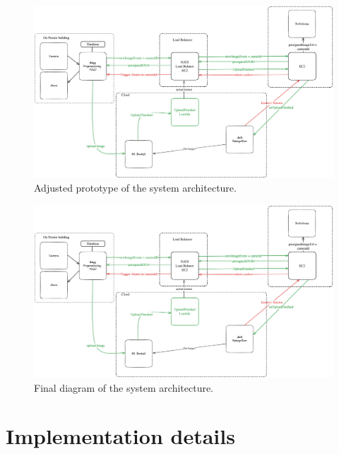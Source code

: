 \documentclass[conference]{IEEEtran}
\begin{document}
\begin{figure}[h!]
	\centering
	\includegraphics[width=1\linewidth]{images/architecturev2.excalidraw.png}
	\caption{Adjusted prototype of the system architecture.}
	\label{fig:prototype-adjusted}
\end{figure}

\begin{figure}[h!]
	\centering
	\includegraphics[width=1\linewidth]{images/architecturev2.excalidraw.png}
	\caption{Final diagram of the system architecture.}
	\label{fig:final-diagram}
\end{figure}
\newpage
\section{Implementation details}
\end{document}
